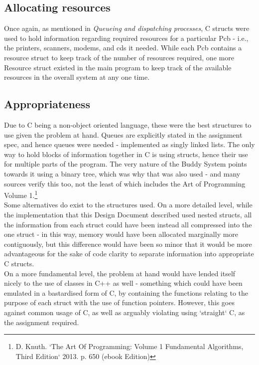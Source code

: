 \documentclass[11pt]{article}
\begin{document}
\subsection{Allocating resources}
Once again, as mentioned in \textit{Queueing and dispatching processes}, C structs were used to hold information regarding required resources for a particular Pcb - i.e., the printers, scanners, modems, and cds it needed. While each Pcb contains a resource struct to keep track of the number of resources required, one more Resource struct existed in the main program to keep track of the available resources in the overall system at any one time.

\subsection{Appropriateness}
Due to C being a non-object oriented language, these were the best structures to use given the problem at hand. Queues are explicitly stated in the assignment spec, and hence queues were needed - implemented as singly linked lists. The only way to hold blocks of information together in C is using structs, hence their use for multiple parts of the program. The very nature of the Buddy System points towards it using a binary tree, which was why that was also used - and many sources verify this too, not the least of which includes the Art of Programming Volume 1.\footnote{D. Knuth. `The Art Of Programming: Volume 1 Fundamental Algorithms, Third Edition` 2013. p. 650 (ebook Edition)}\\

Some alternatives do exist to the structures used. On a more detailed level, while the implementation that this Design Document described used nested structs, all the information from each struct could have been instead all compressed into the one struct - in this way, memory would have been allocated marginally more contiguously, but this difference would have been so minor that it would be more advantageous for the sake of code clarity to separate information into appropriate C structs.\\

On a more fundamental level, the problem at hand would have lended itself nicely to the use of classes in C++ as well - something which could have been emulated in a bastardised form of C, by containing the functions relating to the purpose of each struct with the use of function pointers. However, this goes against common usage of C, as well as arguably violating using `straight` C, as the assignment required.
\end{document}
